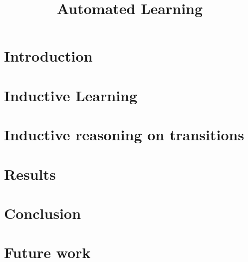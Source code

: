 \documentclass[english]{report}
\title {Automated Learning}
\begin{document}
\maketitle
\tableofcontents
\chapter{Introduction}
	

\chapter{Inductive Learning}
    

\chapter{Inductive reasoning on transitions}
    

\chapter{Results}

\chapter{Conclusion}

\chapter{Future work}

{}

\end{document}
